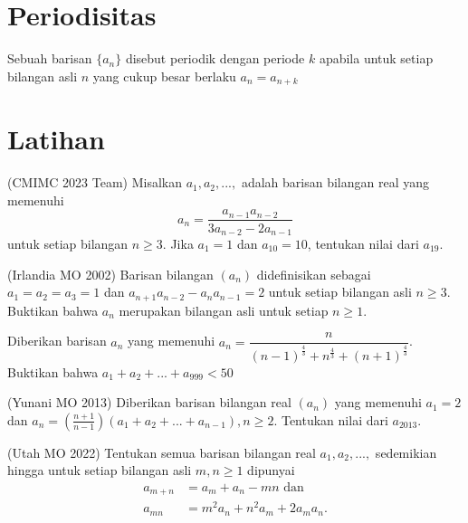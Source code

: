 \documentclass[11pt]{scrartcl}
\begin{document}
\section{Periodisitas}
Sebuah barisan $\{a_n\}$ disebut periodik dengan periode $k$ apabila untuk setiap bilangan asli $n$ yang cukup besar berlaku $a_n = a_{n + k}$

\section{Latihan}
\begin{problem}
    (CMIMC 2023 Team) Misalkan $a_1, a_2, ...,$ adalah barisan bilangan real yang memenuhi $$a_n = \frac{a_{n-1}a_{n-2}}{3a_{n-2}-2a_{n-1}}$$ untuk setiap bilangan $n\geq 3$. Jika $a_1 = 1$ dan $a_{10} = 10$, tentukan nilai dari $a_{19}$.
\end{problem}

\begin{problem}
    (Irlandia MO 2002) Barisan bilangan $(a_n)$ didefinisikan sebagai $a_1 = a_2 = a_3 = 1$ dan $a_{n + 1}a_{n - 2} - a_na_{n - 1} = 2$ untuk setiap bilangan asli $n \geq 3$. Buktikan bahwa $a_n$ merupakan bilangan asli untuk setiap $n \geq 1$.
\end{problem}

\begin{problem}
    Diberikan barisan $a_n$ yang memenuhi $a_n = \dfrac{n}{(n - 1)^{\frac{4}{3}} + n^{\frac{4}{3}} + (n + 1)^{\frac{4}{3}}}$. Buktikan bahwa $a_1 + a_2 + ... + a_{999} < 50$
\end{problem}

\begin{problem}
    (Yunani MO 2013) Diberikan barisan bilangan real $(a_n)$ yang memenuhi $a_1 = 2$ dan $a_n=\left(\frac{n+1}{n-1} \right)\left(a_1+a_2+...+a_{n-1} \right),n\geq 2$. Tentukan nilai dari $a_{2013}$.
\end{problem}

\begin{problem}
    (Utah MO 2022) Tentukan semua barisan bilangan real $a_1, a_2, ...,$ sedemikian hingga untuk setiap bilangan asli $m, n \geq 1$ dipunyai 
    \begin{align*}
        a_{m+n} &= a_m+a_n - mn \text{ dan} \\
        a_{mn} &= m^2a_n + n^2a_m + 2a_ma_n. \\
    \end{align*}
\end{problem}

\end{document}
